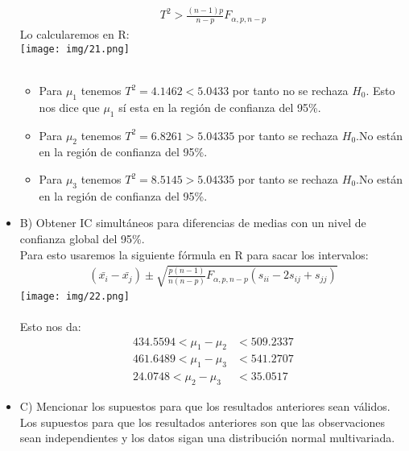 \begin{sol}
\begin{itemize}
\begin{align*}
T^2 > \frac{(n-1)p}{n-p}F_{\alpha,p,n-p}
\end{align*}
Lo calcularemos en R:\\
\texttt{[image: img/21.png]}\\\\
\begin{itemize}
\item Para $\mu_1$ tenemos $T^2=4.1462 < 5.0433$ por tanto no se rechaza $H_0$. Esto nos dice que $\mu_1$ sí esta en la región de confianza del 95\%.
\item Para $\mu_2$ tenemos $T^2=6.8261> 5.04335$ por tanto se rechaza $H_0$.No están en la región de confianza del 95\%.
\item Para $\mu_3$ tenemos $T^2=8.5145 > 5.04335$ por tanto se rechaza $H_0$.No están en la región de confianza del 95\%.
\end{itemize} \pagebreak
\item B) Obtener IC simultáneos para diferencias de medias con un nivel de confianza global del 95\%.\\
Para esto usaremos la siguiente fórmula en R para sacar los intervalos:
\begin{align*}
(\bar{x_i}-\bar{x_j}) \pm \sqrt{\frac{p(n-1)}{n(n-p)}F_{\alpha,p,n-p}(s_{ii}-2s_{ij}+s_{jj})}
\end{align*}
\texttt{[image: img/22.png]}\\\\
Esto nos da: 
\begin{align*}
    434.5594 < \mu_{1} - \mu_{2} &< 509.2337 \\
    461.6489 < \mu_{1} - \mu_{3} &< 541.2707 \\
    24.0748 < \mu_{2} - \mu_{3} &< 35.0517
\end{align*} \pagebreak
\item C) Mencionar los supuestos para que los resultados anteriores sean válidos.\\
Los supuestos para que los resultados anteriores son que las observaciones sean independientes y los datos sigan una distribución normal multivariada. 
\end{itemize}
\end{sol}